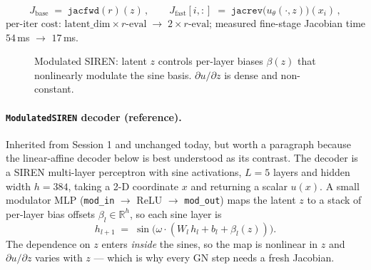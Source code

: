 \[
J_{\text{base}} \;=\; \mathtt{jacfwd}(r)(z)\,, \qquad
J_{\text{fast}}[i,:] \;=\; \mathtt{jacrev}\!\bigl(u_\theta(\cdot,z)\bigr)\!(x_i)\,,
\]
$\text{per-iter cost: } \mathrm{latent\_dim}\times r\text{-eval} \;\to\; 2\times r\text{-eval}$;
measured fine-stage Jacobian time $54$\,ms $\to$ $17$\,ms.

\begin{figure}[H]
  \centering
  \caption*{\small Modulated SIREN: latent $z$ controls per-layer biases $\beta(z)$ that nonlinearly modulate the sine basis. $\partial u/\partial z$ is dense and non-constant.}
\end{figure}

\paragraph{\texttt{ModulatedSIREN} decoder (reference).}
Inherited from Session 1 and unchanged today, but worth a paragraph
because the linear-affine decoder below is best understood as its
contrast. The decoder is a SIREN multi-layer perceptron with sine
activations, $L{=}5$ layers and hidden width $h{=}384$, taking a 2-D
coordinate $x$ and returning a scalar $u(x)$. A small modulator MLP
(\texttt{mod\_in} $\to$ ReLU $\to$ \texttt{mod\_out}) maps the latent
$z$ to a stack of per-layer bias offsets $\beta_l \in \mathbb{R}^h$, so
each sine layer is
\[
h_{l+1} \;=\; \sin\!\bigl(\omega \cdot (W_l \, h_l + b_l + \beta_l(z))\bigr).
\]
The dependence on $z$ enters \emph{inside} the sines, so the map is
nonlinear in $z$ and $\partial u / \partial z$ varies with $z$ ---
which is why every GN step needs a fresh Jacobian.

